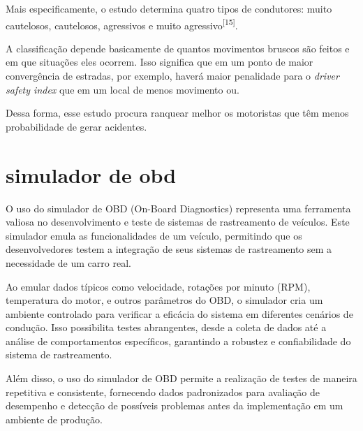Mais especificamente, o estudo determina quatro tipos de condutores: muito cautelosos, cautelosos, agressivos e muito agressivo\textsuperscript{[15]}.

A classificação depende basicamente de quantos movimentos bruscos são feitos e em que situações eles ocorrem. Isso significa que em um ponto de maior convergência de estradas, por exemplo, haverá maior penalidade para o \textit{driver safety index} que em um local de menos movimento ou.

Dessa forma, esse estudo procura ranquear melhor os motoristas que têm menos probabilidade de gerar acidentes.

\section{simulador de obd}
O uso do simulador de OBD (On-Board Diagnostics) representa uma ferramenta valiosa no desenvolvimento e teste de sistemas de rastreamento de veículos. Este simulador emula as funcionalidades de um veículo, permitindo que os desenvolvedores testem a integração de seus sistemas de rastreamento sem a necessidade de um carro real.

Ao emular dados típicos como velocidade, rotações por minuto (RPM), temperatura do motor, e outros parâmetros do OBD, o simulador cria um ambiente controlado para verificar a eficácia do sistema em diferentes cenários de condução. Isso possibilita testes abrangentes, desde a coleta de dados até a análise de comportamentos específicos, garantindo a robustez e confiabilidade do sistema de rastreamento.

Além disso, o uso do simulador de OBD permite a realização de testes de maneira repetitiva e consistente, fornecendo dados padronizados para avaliação de desempenho e detecção de possíveis problemas antes da implementação em um ambiente de produção. 